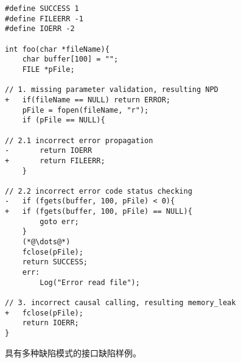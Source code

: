 \begin{figure}[b]
	\centering
\begin{lstlisting}
#define SUCCESS 1
#define FILEERR -1
#define IOERR -2		

int foo(char *fileName){
	char buffer[100] = "";
	FILE *pFile;

// 1. missing parameter validation, resulting NPD
+   if(fileName == NULL) return ERROR;
	pFile = fopen(fileName, "r");
	if (pFile == NULL){

// 2.1 incorrect error propagation
-       return IOERR
+       return FILEERR;
	}

// 2.2 incorrect error code status checking
-   if (fgets(buffer, 100, pFile) < 0){
+   if (fgets(buffer, 100, pFile) == NULL){
		goto err;
	}
	(*@\dots@*)
	fclose(pFile);
	return SUCCESS; 
	err:
		Log("Error read file");

// 3. incorrect causal calling, resulting memory_leak
+   fclose(pFile);
	return IOERR;
}
\end{lstlisting}
	\caption{
	具有多种缺陷模式的接口缺陷样例。
	}
	\label{fig:2-4-example}
\end{figure}